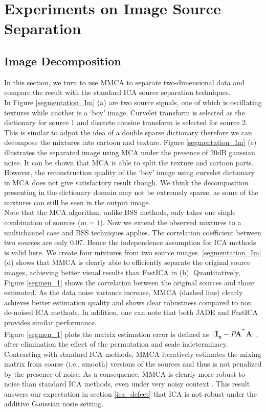 \section{Experiments on Image Source Separation}

\subsection{Image Decomposition}
In this section, we turn to use MMCA to separate two-dimensional data and compare the result with the standard ICA source separation techniques. \\

In Figure \ref{segmentation_Im} (a) are two source signals, one of which is oscillating textures while another is  a `boy' image. Curvelet transform is selected as the dictionary for source 1 and discrete consine transform is selected for source 2. This is similar to adpot the idea of a double sparse dictionary therefore we can decompose the mixtures into cartoon and texture. Figure \ref{segmentation_Im} (c) illustrates the separated image using MCA under the presence of 20dB gaussian noise. It can be shown that MCA is able to split the texture and cartoon parts. However, the reconstruction quality of the `boy' image using curvelet dictionary in MCA does not give satisfactory result though. We think the decomposition presenting in the dictionary domain may not be extremely sparse, as some of the mixtures can still be seen in the output image. \\

Note that the MCA algorithm, unlike BSS methods, only takes one single combination of sources ($m = 1$). Now we extend the observed mixtures to a multichannel case and BSS techniques applies. The correlation coefficient between two sources are only 0.07. Hence the independence assumption for ICA methods is valid here. We create four mixtures from two source images.
\ref{segmentation_Im} (d) shows that MMCA is clearly able to efficiently separate the original source images, achieving better visual results than FastICA in (b). Quantitatively, Figure \ref{segmen_1} shows the correlation between the original sources and those estimated. As the data noise variance increase, 
MMCA (dashed line) clearly achieves better estimation quality and shows clear robustness compared to non de-noised ICA methods. In addition, one can note that both JADE and FastICA provides similar performance.\\

Figure \ref{segmen_1} plots the matrix estimation error is defined as $||\mathbf{I_n} - P\tilde{\mathbf{A}}^{+}\mathbf{A} ||$, after elimination the effect of the permutation and scale indeterminacy. Contrasting with standard ICA methods, MMCA iteratively estimates the mixing matrix from coarse (i.e., smooth) versions of the sources and thus is not penalized by the presence of noise. As a consequence, MMCA is clearly more robust to noise than standard ICA methods, even under very noisy context \cite{BobinJ_2006Mdas}. This result answers our expectation in section \ref{ica_defect} that ICA is not robust under the additive Gaussian nosie setting.\\

